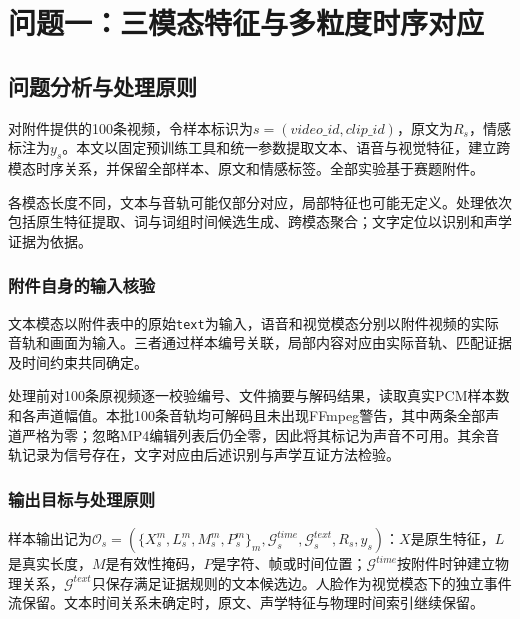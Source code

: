 \section{问题一：三模态特征与多粒度时序对应}
\hypertarget{q1-ux95eeux9898ux5206ux6790ux4e0eux5904ux7406ux539fux5219}{%
\subsection{问题分析与处理原则}\label{q1-ux95eeux9898ux5206ux6790ux4e0eux5904ux7406ux539fux5219}}

对附件提供的100条视频，令样本标识为\(s=(video\_id,clip\_id)\)，原文为\(R_s\)，情感标注为\(y_s\)。本文以固定预训练工具和统一参数提取文本、语音与视觉特征，建立跨模态时序关系，并保留全部样本、原文和情感标签。全部实验基于赛题附件。

各模态长度不同，文本与音轨可能仅部分对应，局部特征也可能无定义。处理依次包括原生特征提取、词与词组时间候选生成、跨模态聚合；文字定位以识别和声学证据为依据。

\hypertarget{q1-ux9644ux4ef6ux81eaux8eabux7684ux8f93ux5165ux6838ux9a8c}{%
\subsubsection{附件自身的输入核验}\label{q1-ux9644ux4ef6ux81eaux8eabux7684ux8f93ux5165ux6838ux9a8c}}

文本模态以附件表中的原始\texttt{text}为输入，语音和视觉模态分别以附件视频的实际音轨和画面为输入。三者通过样本编号关联，局部内容对应由实际音轨、匹配证据及时间约束共同确定。

处理前对100条原视频逐一校验编号、文件摘要与解码结果，读取真实PCM样本数和各声道幅值。本批100条音轨均可解码且未出现FFmpeg警告，其中两条全部声道严格为零；忽略MP4编辑列表后仍全零，因此将其标记为声音不可用。其余音轨记录为信号存在，文字对应由后述识别与声学互证方法检验。

\hypertarget{q1-ux8f93ux51faux76eeux6807ux4e0eux5904ux7406ux539fux5219}{%
\subsubsection{输出目标与处理原则}\label{q1-ux8f93ux51faux76eeux6807ux4e0eux5904ux7406ux539fux5219}}

样本输出记为\(\mathcal O_s=(\{X_s^m,L_s^m,M_s^m,P_s^m\}_m,\mathcal G_s^{time},\mathcal G_s^{text},R_s,y_s)\)：\(X\)是原生特征，\(L\)是真实长度，\(M\)是有效性掩码，\(P\)是字符、帧或时间位置；\(\mathcal G^{time}\)按附件时钟建立物理关系，\(\mathcal G^{text}\)只保存满足证据规则的文本候选边。人脸作为视觉模态下的独立事件流保留。文本时间关系未确定时，原文、声学特征与物理时间索引继续保留。

